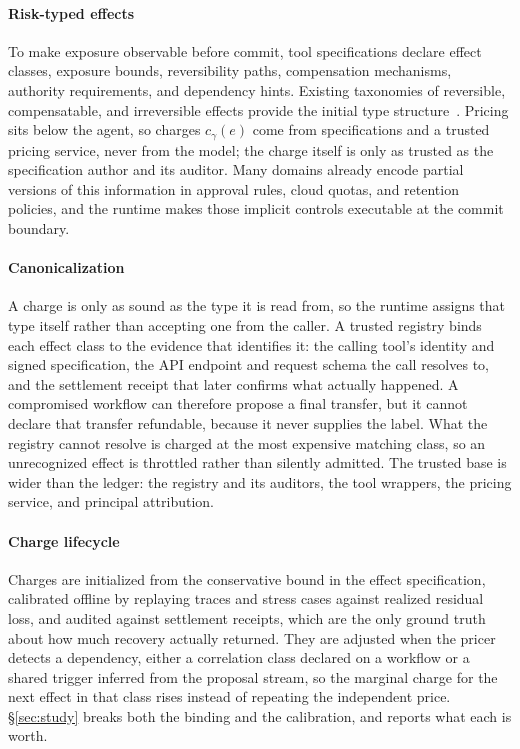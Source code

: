 \documentclass[sigconf]{acmart}
\begin{document}
\paragraph{Risk-typed effects} To make exposure observable before commit, tool specifications declare effect classes, exposure bounds, reversibility paths, compensation mechanisms, authority requirements, and dependency hints. Existing taxonomies of reversible, compensatable, and irreversible effects provide the initial type structure~\cite{GarciaMolina1987Sagas}. Pricing sits below the agent, so charges $c_\gamma(e)$ come from specifications and a trusted pricing service, never from the model; the charge itself is only as trusted as the specification author and its auditor. Many domains already encode partial versions of this information in approval rules, cloud quotas, and retention policies, and the runtime makes those implicit controls executable at the commit boundary.

\paragraph{Canonicalization} A charge is only as sound as the type it is read from, so the runtime assigns that type itself rather than accepting one from the caller. A trusted registry binds each effect class to the evidence that identifies it: the calling tool's identity and signed specification, the API endpoint and request schema the call resolves to, and the settlement receipt that later confirms what actually happened. A compromised workflow can therefore propose a final transfer, but it cannot declare that transfer refundable, because it never supplies the label. What the registry cannot resolve is charged at the most expensive matching class, so an unrecognized effect is throttled rather than silently admitted. The trusted base is wider than the ledger: the registry and its auditors, the tool wrappers, the pricing service, and principal attribution.

\paragraph{Charge lifecycle} Charges are initialized from the conservative bound in the effect specification, calibrated offline by replaying traces and stress cases against realized residual loss, and audited against settlement receipts, which are the only ground truth about how much recovery actually returned. They are adjusted when the pricer detects a dependency, either a correlation class declared on a workflow or a shared trigger inferred from the proposal stream, so the marginal charge for the next effect in that class rises instead of repeating the independent price. \S\ref{sec:study} breaks both the binding and the calibration, and reports what each is worth.
\end{document}
